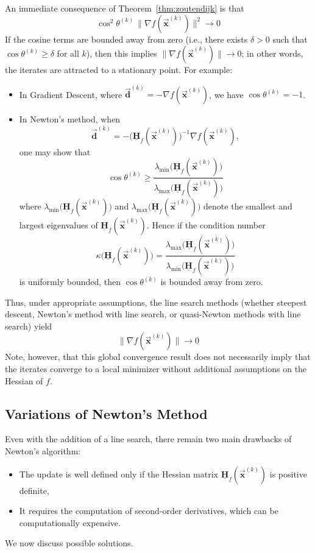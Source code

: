 \documentclass[9pt, headings=standardclasses, parskip=half]{scrartcl}
\newcommand{\matr}[1]{\underline{\boldsymbol{#1}}}
\newcommand{\vect}[1]{\vec{\boldsymbol{#1}}}
\begin{document}
An immediate consequence of Theorem~\ref{thm:zoutendijk} is that
\[
\cos^2\theta^{(k)}\, \|\nabla f(\vect{x}^{(k)})\|^2 \to 0 %
\]
If the cosine terms are bounded away from zero (i.e., there exists \(\delta > 0\) such that \(\cos\theta^{(k)} \ge \delta\) for all \(k\)), then this implies \(\|\nabla f(\vect{x}^{(k)})\| \to 0\); in other words, the iterates are attracted to a stationary point. For example:
\begin{itemize}
  \item In Gradient Descent, where \(\vect{d}^{(k)} = -\nabla f(\vect{x}^{(k)})\), we have \(\cos\theta^{(k)} = -1\).
  \item In Newton's method, when 
  \[
  \vect{d}^{(k)} = -\big(\matr{H}_{f}(\vect{x}^{(k)})\big)^{-1}\nabla f(\vect{x}^{(k)}),
  \]
  one may show that
    \[
    \cos\theta^{(k)} \ge \frac{\lambda_{\min}\bigl(\matr{H}_{f}(\vect{x}^{(k)})\bigr)}{\lambda_{\max}\bigl(\matr{H}_{f}(\vect{x}^{(k)})\bigr)} %
    \]
    where \(\lambda_{\min}\bigl(\matr{H}_{f}(\vect{x}^{(k)})\bigr)\) and \(\lambda_{\max}\bigl(\matr{H}_{f}(\vect{x}^{(k)})\bigr)\) denote the smallest and largest eigenvalues of \(\matr{H}_{f}(\vect{x}^{(k)})\). Hence if the condition number 
    \[
    \kappa\bigl(\matr{H}_{f}(\vect{x}^{(k)})\bigr) = \frac{\lambda_{\max}\bigl(\matr{H}_{f}(\vect{x}^{(k)})\bigr)}{\lambda_{\min}\bigl(\matr{H}_{f}(\vect{x}^{(k)})\bigr)}
    \]
    is uniformly bounded, then \(\cos\theta^{(k)}\) is bounded away from zero.
\end{itemize}

Thus, under appropriate assumptions, the line search methods (whether steepest descent, Newton's method with line search, or quasi-Newton methods with line search) yield
\[
\|\nabla f(\vect{x}^{(k)})\| \to 0 %
\]
Note, however, that this global convergence result does not necessarily imply that the iterates converge to a local minimizer without additional assumptions on the Hessian of \(f\).


\subsection{Variations of Newton's Method}

Even with the addition of a line search, there remain two main drawbacks of Newton's algorithm:
\begin{itemize}
  \item The update is well defined only if the Hessian matrix \(\matr{H}_{f}(\vect{x}^{(k)})\) is positive definite,
  \item It requires the computation of second-order derivatives, which can be computationally expensive.
\end{itemize}
We now discuss possible solutions.
\end{document}
